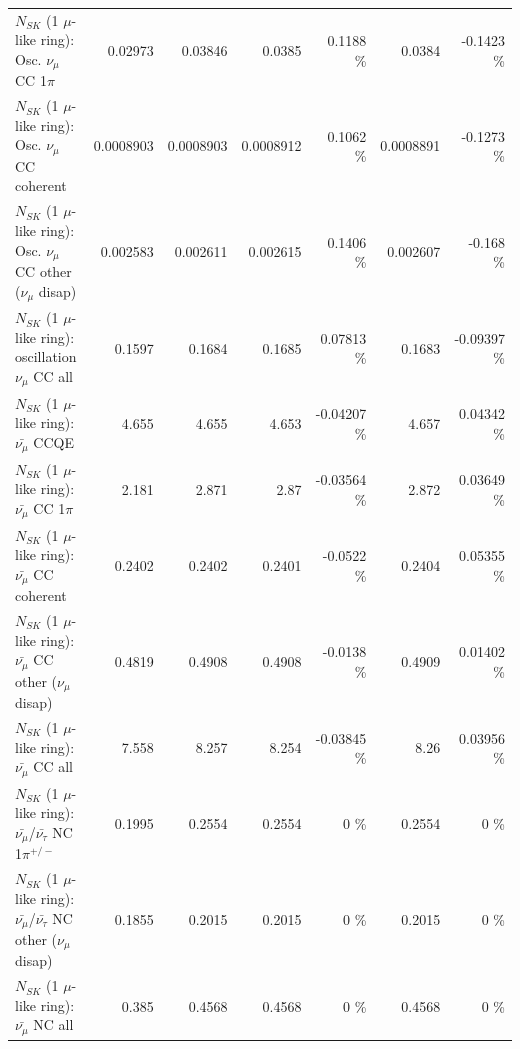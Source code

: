\begin{table}
\begin{tabular}{| l | r | r | r  r | r  r |}
                          $N_{SK}$ (1 $\mu$-like ring): Osc. $\nu_\mu$ CC 1$\pi$ &         0.02973 &         0.03846 &          0.0385 &   0.1188 \%  &          0.0384 &  -0.1423 \%  \\ 
                        $N_{SK}$ (1 $\mu$-like ring): Osc. $\nu_\mu$ CC coherent &       0.0008903 &       0.0008903 &       0.0008912 &   0.1062 \%  &       0.0008891 &  -0.1273 \%  \\ 
         $N_{SK}$ (1 $\mu$-like ring): Osc. $\nu_\mu$ CC other ($\nu_\mu$ disap) &        0.002583 &        0.002611 &        0.002615 &   0.1406 \%  &        0.002607 &   -0.168 \%  \\ 
                      $N_{SK}$ (1 $\mu$-like ring): oscillation $\nu_\mu$ CC all &          0.1597 &          0.1684 &          0.1685 &  0.07813 \%  &          0.1683 & -0.09397 \%  \\ 
\hline
\hline
                              $N_{SK}$ (1 $\mu$-like ring): $\bar{\nu_\mu}$ CCQE &           4.655 &           4.655 &           4.653 & -0.04207 \%  &           4.657 &  0.04342 \%  \\ 
                         $N_{SK}$ (1 $\mu$-like ring): $\bar{\nu_\mu}$ CC 1$\pi$ &           2.181 &           2.871 &            2.87 & -0.03564 \%  &           2.872 &  0.03649 \%  \\ 
                       $N_{SK}$ (1 $\mu$-like ring): $\bar{\nu_\mu}$ CC coherent &          0.2402 &          0.2402 &          0.2401 &  -0.0522 \%  &          0.2404 &  0.05355 \%  \\ 
        $N_{SK}$ (1 $\mu$-like ring): $\bar{\nu_\mu}$ CC other ($\nu_\mu$ disap) &          0.4819 &          0.4908 &          0.4908 &  -0.0138 \%  &          0.4909 &  0.01402 \%  \\ 
                          $N_{SK}$ (1 $\mu$-like ring): $\bar{\nu_{\mu}}$ CC all &           7.558 &           8.257 &           8.254 & -0.03845 \%  &            8.26 &  0.03956 \%  \\ 
\hline
  $N_{SK}$ (1 $\mu$-like ring): $\bar{\nu_\mu}$/$\bar{\nu_\tau}$ NC 1$\pi^{+/-}$ &          0.1995 &          0.2554 &          0.2554 &        0 \%  &          0.2554 &        0 \%  \\ 
$N_{SK}$ (1 $\mu$-like ring): $\bar{\nu_\mu}$/$\bar{\nu_\tau}$ NC other ($\nu_\mu$ disap) &          0.1855 &          0.2015 &          0.2015 &        0 \%  &          0.2015 &        0 \%  \\ 
                          $N_{SK}$ (1 $\mu$-like ring): $\bar{\nu_{\mu}}$ NC all &           0.385 &          0.4568 &          0.4568 &        0 \%  &          0.4568 &        0 \%  \\ 

\end{tabular}
\end{table}
